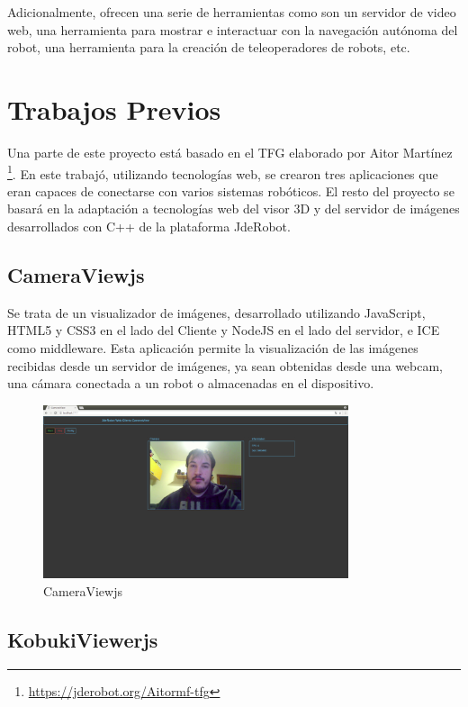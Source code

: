 Adicionalmente, ofrecen una serie de herramientas como son un servidor de video web, una herramienta para mostrar e interactuar con la navegación autónoma del robot, una herramienta para la creación de teleoperadores de robots, etc.

\section{Trabajos Previos}
Una parte de este proyecto está basado en el TFG elaborado por Aitor Martínez \footnote{\url{https://jderobot.org/Aitormf-tfg}}. En este trabajó, utilizando tecnologías web, se crearon tres aplicaciones que eran capaces de conectarse con varios sistemas robóticos. El resto del proyecto se basará en la adaptación a tecnologías web del visor 3D y del servidor de imágenes desarrollados con C++ de la plataforma JdeRobot.

\subsection{CameraViewjs}

Se trata de un visualizador de imágenes, desarrollado utilizando JavaScript, HTML5 y CSS3 en el lado del Cliente y NodeJS en el lado del servidor, e ICE como middleware. Esta aplicación permite la visualización de las imágenes recibidas desde un servidor de imágenes, ya sean obtenidas desde una webcam, una cámara conectada a un robot o almacenadas en el dispositivo.

\begin{figure}[H]
  \begin{center}
    \includegraphics[width=0.8\textwidth]{figures/cameraviewjs.png}
		\caption{CameraViewjs}
		\label{fig.cameraviewjs}
		\end{center}
\end{figure}

\subsection{KobukiViewerjs}

